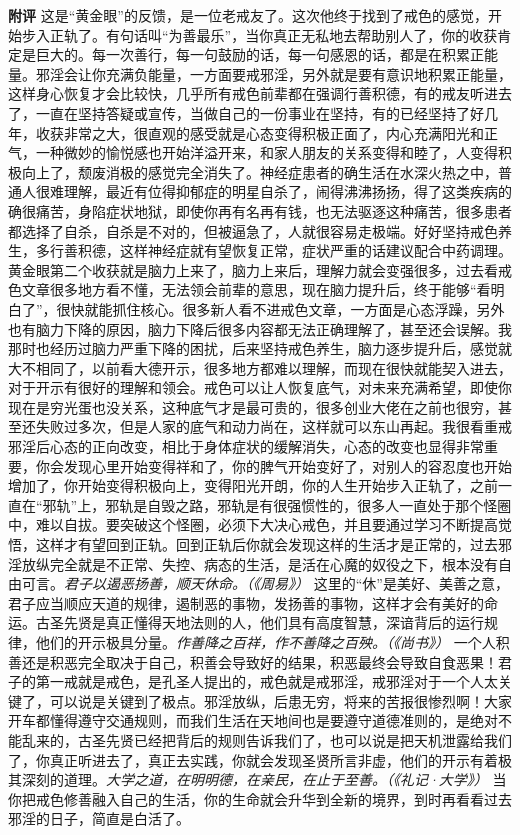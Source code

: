 \begin{case}
    \textbf{附评} 这是“黄金眼”的反馈，是一位老戒友了。这次他终于找到了戒色的感觉，开始步入正轨了。有句话叫“为善最乐”，当你真正无私地去帮助别人了，你的收获肯定是巨大的。每一次善行，每一句鼓励的话，每一句感恩的话，都是在积累正能量。邪淫会让你充满负能量，一方面要戒邪淫，另外就是要有意识地积累正能量，这样身心恢复才会比较快，几乎所有戒色前辈都在强调行善积德，有的戒友听进去了，一直在坚持答疑或宣传，当做自己的一份事业在坚持，有的已经坚持了好几年，收获非常之大，很直观的感受就是心态变得积极正面了，内心充满阳光和正气，一种微妙的愉悦感也开始洋溢开来，和家人朋友的关系变得和睦了，人变得积极向上了，颓废消极的感觉完全消失了。神经症患者的确生活在水深火热之中，普通人很难理解，最近有位得抑郁症的明星自杀了，闹得沸沸扬扬，得了这类疾病的确很痛苦，身陷症状地狱，即使你再有名再有钱，也无法驱逐这种痛苦，很多患者都选择了自杀，自杀是不对的，但被逼急了，人就很容易走极端。好好坚持戒色养生，多行善积德，这样神经症就有望恢复正常，症状严重的话建议配合中药调理。黄金眼第二个收获就是脑力上来了，脑力上来后，理解力就会变强很多，过去看戒色文章很多地方看不懂，无法领会前辈的意思，现在脑力提升后，终于能够“看明白了”，很快就能抓住核心。很多新人看不进戒色文章，一方面是心态浮躁，另外也有脑力下降的原因，脑力下降后很多内容都无法正确理解了，甚至还会误解。我那时也经历过脑力严重下降的困扰，后来坚持戒色养生，脑力逐步提升后，感觉就大不相同了，以前看大德开示，很多地方都难以理解，而现在很快就能契入进去，对于开示有很好的理解和领会。戒色可以让人恢复底气，对未来充满希望，即使你现在是穷光蛋也没关系，这种底气才是最可贵的，很多创业大佬在之前也很穷，甚至还失败过多次，但是人家的底气和动力尚在，这样就可以东山再起。我很看重戒邪淫后心态的正向改变，相比于身体症状的缓解消失，心态的改变也显得非常重要，你会发现心里开始变得祥和了，你的脾气开始变好了，对别人的容忍度也开始增加了，你开始变得积极向上，变得阳光开朗，你的人生开始步入正轨了，之前一直在“邪轨”上，邪轨是自毁之路，邪轨是有很强惯性的，很多人一直处于那个怪圈中，难以自拔。要突破这个怪圈，必须下大决心戒色，并且要通过学习不断提高觉悟，这样才有望回到正轨。回到正轨后你就会发现这样的生活才是正常的，过去邪淫放纵完全就是不正常、失控、病态的生活，是活在心魔的奴役之下，根本没有自由可言。\textit{君子以遏恶扬善，顺天休命。（《周易》）} 这里的“休”是美好、美善之意，君子应当顺应天道的规律，遏制恶的事物，发扬善的事物，这样才会有美好的命运。古圣先贤是真正懂得天地法则的人，他们具有高度智慧，深谙背后的运行规律，他们的开示极具分量。\textit{作善降之百祥，作不善降之百殃。（《尚书》）} 一个人积善还是积恶完全取决于自己，积善会导致好的结果，积恶最终会导致自食恶果！君子的第一戒就是戒色，是孔圣人提出的，戒色就是戒邪淫，戒邪淫对于一个人太关键了，可以说是关键到了极点。邪淫放纵，后患无穷，将来的苦报很惨烈啊！大家开车都懂得遵守交通规则，而我们生活在天地间也是要遵守道德准则的，是绝对不能乱来的，古圣先贤已经把背后的规则告诉我们了，也可以说是把天机泄露给我们了，你真正听进去了，真正去实践，你就会发现圣贤所言非虚，他们的开示有着极其深刻的道理。\textit{大学之道，在明明德，在亲民，在止于至善。（《礼记·大学》）} 当你把戒色修善融入自己的生活，你的生命就会升华到全新的境界，到时再看看过去邪淫的日子，简直是白活了。
\end{case}

